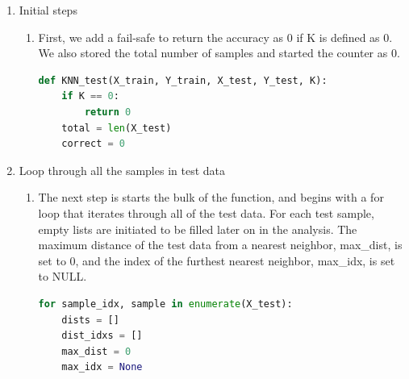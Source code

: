 \documentclass[11pt]{article}
\theoremstyle{definition}
\begin{document}
\begin{enumerate}
 \item Initial steps
 \begin{enumerate}
    \item First, we add a fail-safe to return the accuracy as 0 if K is defined as 0. We also stored the \textsf{total} number of samples and started the \textsf{counter} as 0.
\begin{lstlisting}[language=python, frame=single]
def KNN_test(X_train, Y_train, X_test, Y_test, K):
    if K == 0:
    	return 0
    total = len(X_test)
    correct = 0
\end{lstlisting}    
    \end{enumerate}
 \item Loop through all the samples in test data
 \begin{enumerate}
     \item The next step is starts the bulk of the function, and begins with a \textsf{for loop} that iterates through all of the test data. For each test sample, empty lists are initiated to be filled later on in the analysis. The maximum distance of the test data from a nearest neighbor, \textsf{max\_dist}, is set to 0, and the index of the furthest nearest neighbor, \textsf{max\_idx}, is set to NULL. 
\begin{lstlisting}[language=python, frame=single]
for sample_idx, sample in enumerate(X_test):
    dists = []
    dist_idxs = []
    max_dist = 0
    max_idx = None
\end{lstlisting}


\end{enumerate}
\end{enumerate}
\end{document}
